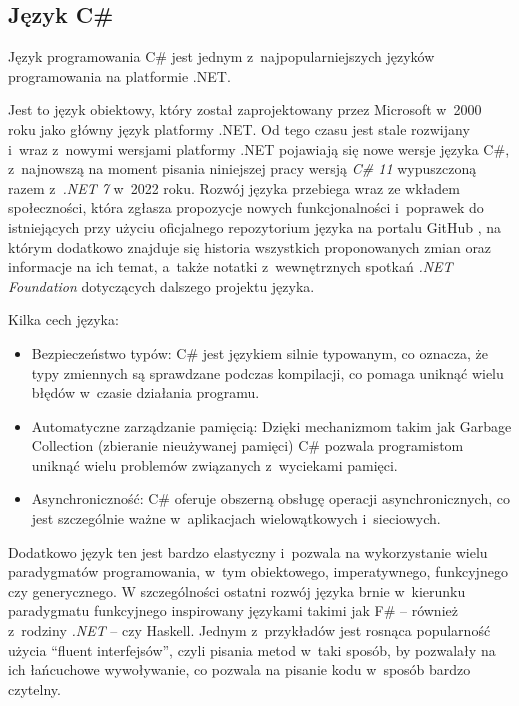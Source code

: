 \subsection{Język C\#}
\label{sec:csharp}

Język programowania C\# jest jednym z~najpopularniejszych języków programowania na platformie .NET.

Jest to język obiektowy, który został zaprojektowany przez Microsoft w~2000 roku jako główny język platformy .NET.
Od tego czasu jest stale rozwijany i~wraz z~nowymi wersjami platformy .NET pojawiają się nowe wersje języka C\#, z~najnowszą na moment pisania niniejszej pracy wersją \emph{C\# 11} wypuszczoną razem z~\emph{.NET 7} w~2022 roku.
Rozwój języka przebiega wraz ze wkładem społeczności, która zgłasza propozycje nowych funkcjonalności i~poprawek do istniejących przy użyciu oficjalnego repozytorium języka na portalu GitHub \cite{dotnet-csharplang-repo}, na którym dodatkowo znajduje się historia wszystkich proponowanych zmian oraz informacje na ich temat, a~także notatki z~wewnętrznych spotkań \emph{.NET Foundation} dotyczących dalszego projektu języka.

Kilka cech języka:

\begin{itemize}

  \item Bezpieczeństwo typów: C\# jest językiem silnie typowanym, co oznacza, że typy zmiennych są sprawdzane podczas kompilacji, co pomaga uniknąć wielu błędów w~czasie działania programu.

  \item Automatyczne zarządzanie pamięcią: Dzięki mechanizmom takim jak Garbage Collection (zbieranie nieużywanej pamięci) C\# pozwala programistom uniknąć wielu problemów związanych z~wyciekami pamięci.

  \item Asynchroniczność: C\# oferuje obszerną obsługę operacji asynchronicznych, co jest szczególnie ważne w~aplikacjach wielowątkowych i~sieciowych.

\end{itemize}

Dodatkowo język ten jest bardzo elastyczny i~pozwala na wykorzystanie wielu paradygmatów programowania, w~tym obiektowego, imperatywnego, funkcyjnego czy generycznego.
W szczególności ostatni rozwój języka brnie w~kierunku paradygmatu funkcyjnego inspirowany językami takimi jak F\# -- również z~rodziny \emph{.NET} -- czy Haskell.
Jednym z~przykładów jest rosnąca popularność użycia ``fluent interfejsów'', czyli pisania metod w~taki sposób, by pozwalały na ich łańcuchowe wywoływanie, co pozwala na pisanie kodu w~sposób bardzo czytelny.

